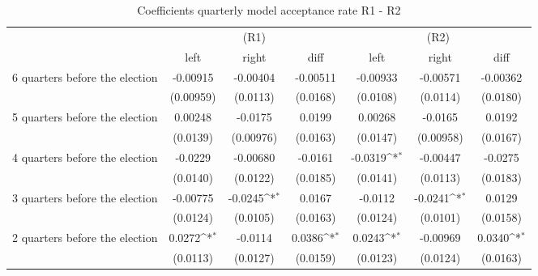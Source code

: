 \begin{table}[!ht]\centering \footnotesize
\def\sym#1{\ifmmode^{#1}\else\(^{#1}\)\fi}
\caption{Coefficients quarterly model acceptance rate R1 - R2}
\begin{tabular}{l*{6}{c}}
\hline\hline
                    &\multicolumn{3}{c}{(R1)}&\multicolumn{3}{c}{(R2)}\\
&\multicolumn{1}{c}{left}&\multicolumn{1}{c}{right}&\multicolumn{1}{c}{diff}&\multicolumn{1}{c}{left}&\multicolumn{1}{c}{right}&\multicolumn{1}{c}{diff}\\
\hline
 6 quarters before the election&    -0.00915         &    -0.00404         &    -0.00511         &    -0.00933         &    -0.00571         &    -0.00362         \\
                    &   (0.00959)         &    (0.0113)         &    (0.0168)         &    (0.0108)         &    (0.0114)         &    (0.0180)         \\
[0,5em]
 5 quarters before the election&     0.00248         &     -0.0175         &      0.0199         &     0.00268         &     -0.0165         &      0.0192         \\
                    &    (0.0139)         &   (0.00976)         &    (0.0163)         &    (0.0147)         &   (0.00958)         &    (0.0167)         \\
[0,5em]
 4 quarters before the election&     -0.0229         &    -0.00680         &     -0.0161         &     -0.0319\sym{*}  &    -0.00447         &     -0.0275         \\
                    &    (0.0140)         &    (0.0122)         &    (0.0185)         &    (0.0141)         &    (0.0113)         &    (0.0183)         \\
[0,5em]
 3 quarters before the election&    -0.00775         &     -0.0245\sym{*}  &      0.0167         &     -0.0112         &     -0.0241\sym{*}  &      0.0129         \\
                    &    (0.0124)         &    (0.0105)         &    (0.0163)         &    (0.0124)         &    (0.0101)         &    (0.0158)         \\
[0,5em]
 2 quarters before the election&      0.0272\sym{*}  &     -0.0114         &      0.0386\sym{*}  &      0.0243\sym{*}  &    -0.00969         &      0.0340\sym{*}  \\
                    &    (0.0113)         &    (0.0127)         &    (0.0159)         &    (0.0123)         &    (0.0124)         &    (0.0163)         \\

\end{tabular}
\end{table}
